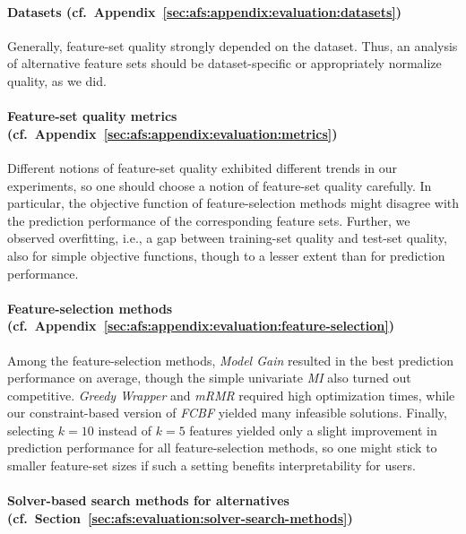 \documentclass{article}
\theoremstyle{definition}
\begin{document}
\paragraph{Datasets (cf.~Appendix~\ref{sec:afs:appendix:evaluation:datasets})}

Generally, feature-set quality strongly depended on the dataset.
Thus, an analysis of alternative feature sets should be dataset-specific or appropriately normalize quality, as we did.

\paragraph{Feature-set quality metrics (cf.~Appendix~\ref{sec:afs:appendix:evaluation:metrics})}

Different notions of feature-set quality exhibited different trends in our experiments, so one should choose a notion of feature-set quality carefully.
In particular, the objective function of feature-selection methods might disagree with the prediction performance of the corresponding feature sets.
Further, we observed overfitting, i.e., a gap between training-set quality and test-set quality, also for simple objective functions, though to a lesser extent than for prediction performance.

\paragraph{Feature-selection methods (cf.~Appendix~\ref{sec:afs:appendix:evaluation:feature-selection})}

Among the feature-selection methods, \emph{Model Gain} resulted in the best prediction performance on average, though the simple univariate \emph{MI} also turned out competitive.
\emph{Greedy Wrapper} and \emph{mRMR} required high optimization times, while our constraint-based version of \emph{FCBF} yielded many infeasible solutions.
Finally, selecting $k=10$ instead of $k=5$ features yielded only a slight improvement in prediction performance for all feature-selection methods, so one might stick to smaller feature-set sizes if such a setting benefits interpretability for users.

\paragraph{Solver-based search methods for alternatives (cf.~Section~\ref{sec:afs:evaluation:solver-search-methods})}
\end{document}
